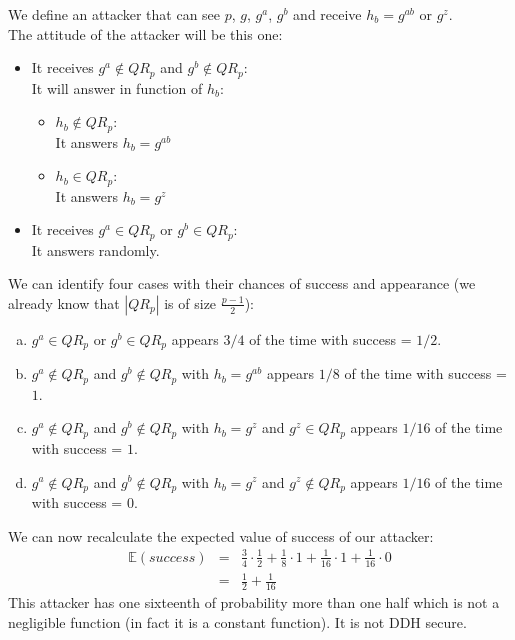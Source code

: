 \begin{solution}
\begin{enumerate}
		We define an attacker that can see $p$, $g$, $g^a$, $g^b$ and receive $h_b = g^{ab}$ or $g^z$.\\ 
		The attitude of the attacker will be this one:
		\begin{itemize}
			\item It receives $g^a \notin QR_p$ and $g^b \notin QR_p$:\\
				It will answer in function of $h_b$:
				\begin{itemize}
					\item $h_b \notin QR_p$:\\
						It answers $h_b = g^{ab}$
					\item $h_b \in QR_p$:\\
						It answers $h_b = g^z$
				\end{itemize}
			\item It receives $g^a \in QR_p$ or $g^b \in QR_p$:\\
				It answers randomly.
		\end{itemize}
		We can identify four cases with their chances of success and appearance (we already know that $\left|QR_p\right|$ is of size $\frac{p-1}{2}$):
		\begin{enumerate}[a)]
			\item $g^a \in QR_p$ or $g^b \in QR_p$ appears $3/4$ of the time with success = $1/2$.
			\item $g^a \notin QR_p$ and $g^b \notin QR_p$ with $h_b = g^{ab}$  appears $1/8$ of the time with success = $1$.
			\item $g^a \notin QR_p$ and $g^b \notin QR_p$ with $h_b = g^z$ and $g^z \in QR_p$  appears $1/16$ of the time with success = $1$.
			\item $g^a \notin QR_p$ and $g^b \notin QR_p$ with $h_b = g^z$ and $g^z \notin QR_p$  appears $1/16$ of the time with success = $0$.
		\end{enumerate}
		We can now recalculate the expected value of success of our attacker:
		$$\begin{array}{rcl}
			\mathbb{E}(success) &=& \frac{3}{4}\cdot \frac{1}{2} +  \frac{1}{8}\cdot 1 + \frac{1}{16}\cdot 1 + \frac{1}{16}\cdot 0\\
								&=& \frac{1}{2} + \frac{1}{16}
		\end{array}$$
		This attacker has one sixteenth of probability more than one half which is not a negligible function (in fact it is a constant function). It is not DDH secure.
\end{enumerate}
\end{solution}